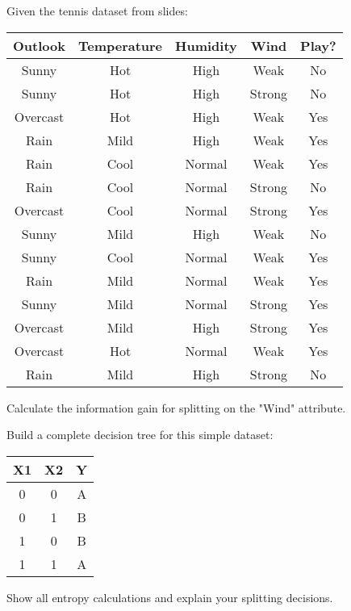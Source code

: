 \documentclass{article}
\newcounter{exercise}
\begin{document}
\begin{tcolorbox}[colback=gray!5!white,colframe=gray!75!black,title=Problem \stepcounter{exercise}: Information Gain Calculation]

Given the tennis dataset from slides:
\begin{center}
\begin{tabular}{|c|c|c|c|c|}
\hline
\textbf{Outlook} & \textbf{Temperature} & \textbf{Humidity} & \textbf{Wind} & \textbf{Play?} \\
\hline
Sunny & Hot & High & Weak & No \\
Sunny & Hot & High & Strong & No \\
Overcast & Hot & High & Weak & Yes \\
Rain & Mild & High & Weak & Yes \\
Rain & Cool & Normal & Weak & Yes \\
Rain & Cool & Normal & Strong & No \\
Overcast & Cool & Normal & Strong & Yes \\
Sunny & Mild & High & Weak & No \\
Sunny & Cool & Normal & Weak & Yes \\
Rain & Mild & Normal & Weak & Yes \\
Sunny & Mild & Normal & Strong & Yes \\
Overcast & Mild & High & Strong & Yes \\
Overcast & Hot & Normal & Weak & Yes \\
Rain & Mild & High & Strong & No \\
\hline
\end{tabular}
\end{center}

Calculate the information gain for splitting on the "Wind" attribute.
\end{tcolorbox}

\begin{tcolorbox}[colback=gray!5!white,colframe=gray!75!black,title=Problem \stepcounter{exercise}: Tree Construction]

Build a complete decision tree for this simple dataset:
\begin{center}
\begin{tabular}{|c|c|c|}
\hline
\textbf{X1} & \textbf{X2} & \textbf{Y} \\
\hline
0 & 0 & A \\
0 & 1 & B \\
1 & 0 & B \\
1 & 1 & A \\
\hline
\end{tabular}
\end{center}

Show all entropy calculations and explain your splitting decisions.
\end{tcolorbox}
\end{document}
